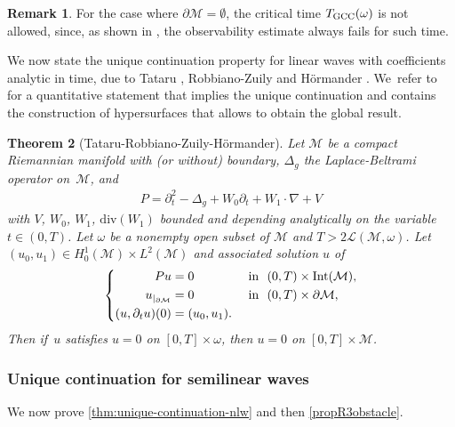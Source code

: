 \documentclass[10pt]{amsart}
\newtheorem{theorem}{Theorem}[section]
\theoremstyle{definition}
\newtheorem{remark}[theorem]{Remark}
\let\mc\mathcal
\newcommand{\M}{\mc{M}}
\providecommand{\Int}[1]{\textup{Int}(#1)}
\begin{document}
\begin{remark}
For the case where $\partial\M=\emptyset$, the critical time $T_{\textup{GCC}}(\omega)$ is not allowed, since, as shown in \cite[Th.\,1.1]{LL16}, the observability estimate always fails for such time.
\end{remark}

We now state the unique continuation property for linear waves with coefficients analytic in time, due to Tataru \cite{Tat95,Tat99}, Robbiano-Zuily \cite{RZ:98} and Hörmander \cite{Hor:97}. We~refer to \cite[Th.\,6.1]{LL19} for a quantitative statement that implies the unique continuation and contains the construction of hypersurfaces that allows to obtain the global result.

\begin{theorem}[Tataru-Robbiano-Zuily-Hörmander]\label{thm:qucp}
Let $\M$ be a compact Riemannian manifold with (or without) boundary, $\Delta_g$ the Laplace-Beltrami operator on~$\M$, and
\begin{align*}
P=\partial_t^2-\Delta_g+W_0\partial_t+W_1\cdot\nabla+V
\end{align*}
with $V$, $W_0$, $W_1$, $\text{div}(W_1)$ bounded and depending analytically on the variable $t\in (0, T)$. Let $\omega$ be a nonempty open subset of $\M$ and $T>2\mc{L}(\M, \omega)$. Let $(u_0, u_1)\in H_0^1(\M)\times L^2(\M)$ and associated solution $u$ of
\begin{align*}
\left\{\begin{aligned}
Pu&=0&&\text{ in }\ (0, T)\times\Int{\M},\\
u_{|_{\partial\M}}&=0 &&\text{ in }\ (0, T)\times \partial\M,\\
(u, \partial_t u)(0)&=(u_0, u_1). &
\end{aligned} \right.
\end{align*}
Then if~$u$ satisfies $u=0$ on $[0,T]\times \omega$, then $u=0$ on $[0,T]\times \M$.
\end{theorem}

\subsubsection{Unique continuation for semilinear waves} We now prove \cref{thm:unique-continuation-nlw} and then \cref{propR3obstacle}.
\end{document}

